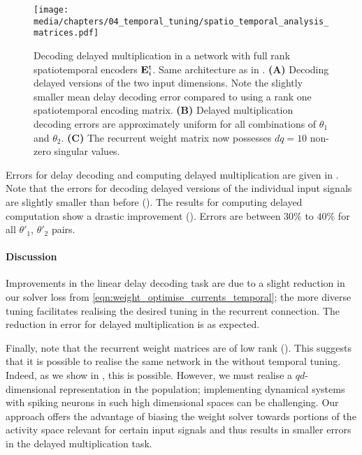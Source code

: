 \begin{figure}
	\centering
	\texttt{[image: media/chapters/04\_temporal\_tuning/spatio\_temporal\_analysis\_matrices.pdf]}%
	{\label{fig:spatio_temporal_full_a}}%
	{\label{fig:spatio_temporal_full_b}}%
	{\label{fig:spatio_temporal_full_c}}%
	\caption[Decoding delayed multiplication in a network with full rank spatiotemporal encoders]{
		Decoding delayed multiplication in a network with full rank spatiotemporal encoders $\mathbf{E}_i^\mathrm{t}$.
		Same architecture as in .
		\textbf{(A)} Decoding delayed versions of the two input dimensions. Note the slightly smaller mean delay decoding error compared to using a rank one spatiotemporal encoding matrix.
		\textbf{(B)} Delayed multiplication decoding errors are approximately uniform for all combinations of $\theta_1$ and $\theta_2$.
		\textbf{(C)} The recurrent weight matrix now possesses $d q = 10$ non-zero singular values.
	}
	\label{fig:spatio_temporal_full}
\end{figure}

Errors for delay decoding and computing delayed multiplication are given in .
Note that the errors for decoding delayed versions of the individual input signals are slightly smaller than before ().
The results for computing delayed computation show a drastic improvement ().
Errors are between $30\%$ to $40\%$ for all $\theta'_1$, $\theta'_2$ pairs.

\paragraph{Discussion}
Improvements in the linear delay decoding task are due to a slight reduction in our solver loss from \cref{eqn:weight_optimise_currents_temporal}; the more diverse tuning facilitates realising the desired tuning in the recurrent connection.
The reduction in error for delayed multiplication is as expected.

Finally, note that the recurrent weight matrices are of low rank ().
This suggests that it is possible to realise the same network in the \NEF without temporal tuning.
Indeed, as we show in , this is possible.
However, we must realise a $qd$-dimensional representation in the population; implementing dynamical systems with spiking neurons in such high dimensional spaces can be challenging.
Our approach offers the advantage of biasing the weight solver towards portions of the activity space relevant for certain input signals and thus results in smaller errors in the delayed multiplication task.

